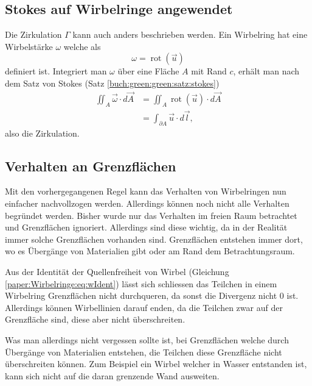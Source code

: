 \subsection{Stokes auf Wirbelringe angewendet \label{paper:Wirbelringe:Stokes}}

Die Zirkulation \(\Gamma\) kann auch anders beschrieben werden. 
Ein Wirbelring hat eine Wirbelstärke \(\omega\) welche als
\[
\omega
=
\operatorname{rot}\left( \vec{u} \right)
\]
definiert ist.
Integriert man $\omega$ über eine Fläche \(A\) mit Rand \(c\), erhält man nach dem Satz von Stokes (Satz \ref{buch:green:green:satz:stokes})
\begin{align*}
\iint_{A} \vec{\omega} \cdot d \vec{A}
&=
\iint_{A} \operatorname{rot}\left(\vec{u}\right)\cdot  d \vec{A}\\
&=
\int_{\partial A} \vec{u} \cdot d\vec{l},
\end{align*}
also die Zirkulation.

\subsection{Verhalten an Grenzflächen \label{paper:Wirbelringe:Grenzflaechen}}

Mit den vorhergegangenen Regel kann das Verhalten von Wirbelringen nun einfacher nachvollzogen werden. 
Allerdings können noch nicht alle Verhalten begründet werden. 
Bisher wurde nur das Verhalten im freien Raum betrachtet und Grenzflächen ignoriert. 
Allerdings sind diese wichtig, da in der Realität immer solche Grenzflächen vorhanden sind. 
Grenzflächen entstehen immer dort, wo es Übergänge von Materialien gibt oder am Rand dem Betrachtungsraum.

Aus der Identität der Quellenfreiheit von Wirbel (Gleichung \ref{paper:Wirbelringe:eq:wIdent}) lässt sich schliessen das Teilchen in einem Wirbelring Grenzflächen nicht durchqueren, da sonst die Divergenz nicht \(0\) ist. 
Allerdings können Wirbellinien darauf enden, da die Teilchen zwar auf der Grenzfläche sind, diese aber nicht überschreiten. 

Was man allerdings nicht vergessen sollte ist, bei Grenzflächen welche durch Übergänge von Materialien entstehen, die Teilchen diese Grenzfläche nicht überschreiten können. 
Zum Beispiel ein Wirbel welcher in Wasser entstanden ist, kann sich nicht auf die daran grenzende Wand ausweiten.  
